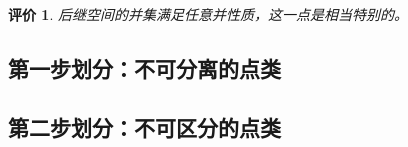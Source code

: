 \documentclass[oneside, 12pt]{ctexart}
\newtheorem{remark}{评价}[section]
\begin{document}
\begin{remark}
	后继空间的并集满足任意并性质，这一点是相当特别的。
\end{remark}


\subsection{第一步划分：不可分离的点类}

\subsection{第二步划分：不可区分的点类}
\end{document}
